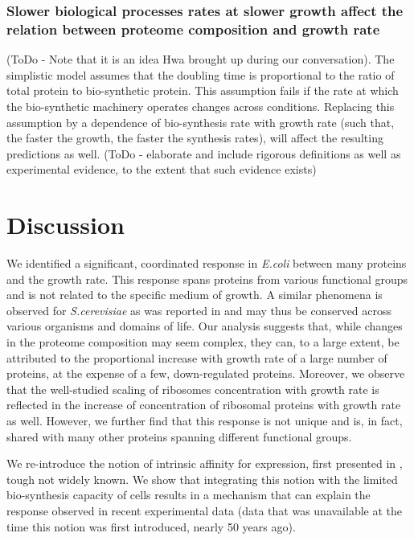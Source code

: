 \documentclass[notitlepage]{article}
\begin{document}
\subsubsection{Slower biological processes rates at slower growth affect the relation between proteome composition and growth rate}
(ToDo - Note that it is an idea Hwa brought up during our conversation).
The simplistic model assumes that the doubling time is proportional to the ratio of total protein to bio-synthetic protein.
This assumption fails if the rate at which the bio-synthetic machinery operates changes across conditions.
Replacing this assumption by a dependence of bio-synthesis rate with growth rate (such that, the faster the growth, the faster the synthesis rates), will affect the resulting predictions as well.
(ToDo - elaborate and include rigorous definitions as well as experimental evidence, to the extent that such evidence exists)
\section{Discussion}
We identified a significant, coordinated response in \emph{E.coli} between many proteins and the growth rate.
This response spans proteins from various functional groups and is not related to the specific medium of growth.
A similar phenomena is observed for \emph{S.cerevisiae} as was reported in \parencite{Keren2013a} and may thus be conserved across various organisms and domains of life.
Our analysis suggests that, while changes in the proteome composition may seem complex, they can, to a large extent, be attributed to the proportional increase with growth rate of a large number of proteins, at the expense of a few, down-regulated proteins.
Moreover, we observe that the well-studied scaling of ribosomes concentration with growth rate is reflected in the increase of concentration of ribosomal proteins with growth rate as well.
However, we further find that this response is not unique and is, in fact, shared with many other proteins spanning different functional groups.

We re-introduce the notion of intrinsic affinity for expression, first presented in \parencite{Maaloe1969}, tough not widely known.
We show that integrating this notion with the limited bio-synthesis capacity of cells results in a mechanism that can explain the response observed in recent experimental data (data that was unavailable at the time this notion was first introduced, nearly 50 years ago).
\end{document}
